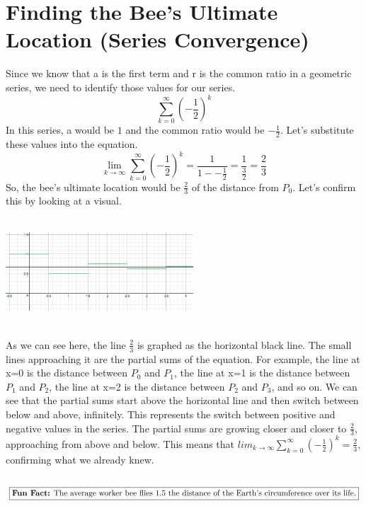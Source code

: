 \documentclass[a4paper,openright, 14pt]{article}
\begin{document}
\section*{Finding the Bee's Ultimate Location (Series Convergence)}
Since we know that a is the first term and r is the common ratio in a geometric series, we need to identify those values for our series.
$$\sum\limits_{k=0}^{\infty} (-\frac{1}{2})^k$$
In this series, a would be $1$ and the common ratio would be $-\frac{1}{2}$. Let's substitute these values into the equation.
$$\lim_{k\to\infty}\sum\limits_{k=0}^{\infty} (-\frac{1}{2})^k= \frac{1}{1--\frac{1}{2}}=\frac{1}{\frac{3}{2}}=\frac{2}{3}$$
So, the bee's ultimate location would be $\frac{2}{3}$ of the distance from $P_0$. Let's confirm this by looking at a visual.
\begin{center}
    \includegraphics[width=7cm, height=4cm]{Images/line.png}
\end{center}
As we can see here, the line $\frac{2}{3}$ is graphed as the horizontal black line. The small lines approaching it are the partial sums of the equation. For example, the line at x=0 is the distance between $P_0$ and $P_1$, the line at x=1 is the distance between $P_1$ and $P_2$, the line at x=2 is the distance between $P_2$ and $P_3$, and so on. We can see that the partial sums start above the horizontal line and then switch between below and above, infinitely. This represents the switch between positive and negative values in the series. The partial sums are growing closer and closer to $\frac{2}{3}$, approaching from above and below. This means that $lim_{k\to\infty}\sum\limits_{k=0}^{\infty} (-\frac{1}{2})^k=\frac{2}{3}$, confirming what we already knew.
\\\\
$$\fbox{\textbf{Fun Fact:} The average worker bee flies 1.5 the distance of the Earth's circumference over its life.}$$
\end{document}
